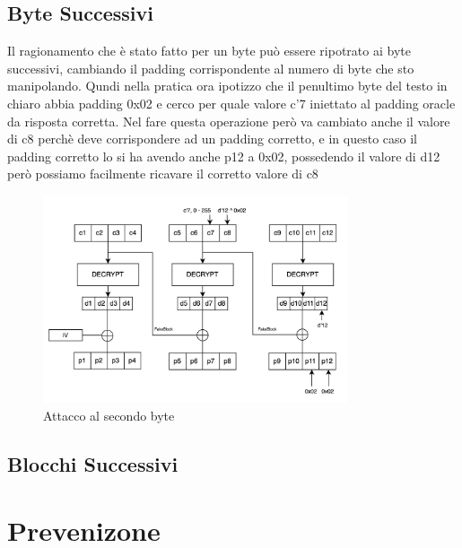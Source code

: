 \subsection{Byte Successivi}
Il ragionamento che è stato fatto per un byte può essere ripotrato ai byte successivi, cambiando il padding corrispondente al numero di byte che sto manipolando.
Qundi nella pratica ora ipotizzo che il penultimo byte del testo in chiaro abbia padding 0x02 e cerco per quale valore c'7 iniettato al padding oracle da risposta corretta.
Nel fare questa operazione però va cambiato anche il valore di c8 perchè deve corrispondere ad un padding corretto, e in questo caso il padding corretto lo 
si ha avendo anche p12 a 0x02, possedendo il valore di d12 però possiamo facilmente ricavare il corretto valore di c8
\begin{figure}[h!]
    \includegraphics[width=0.8\textwidth]{img/attack_second_byte.jpeg}
    \centering
    \caption{Attacco al secondo byte}
    \label{fig:attack_3}
\end{figure}
\subsection{Blocchi Successivi}
\section{Prevenizone}
